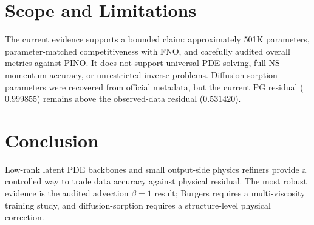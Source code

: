 \documentclass[11pt]{article}
\begin{document}
\section{Scope and Limitations}
The current evidence supports a bounded claim: approximately 501K parameters,
parameter-matched competitiveness with FNO, and carefully audited overall
metrics against PINO. It does not support universal PDE solving, full NS
momentum accuracy, or unrestricted inverse problems. Diffusion-sorption
parameters were recovered from official metadata, but the current PG residual
($0.999855$) remains above the observed-data residual ($0.531420$).

\section{Conclusion}
Low-rank latent PDE backbones and small output-side physics refiners provide a
controlled way to trade data accuracy against physical residual. The most
robust evidence is the audited advection $\beta=1$ result; Burgers requires a
multi-viscosity training study, and diffusion-sorption requires a
structure-level physical correction.



\end{document}
